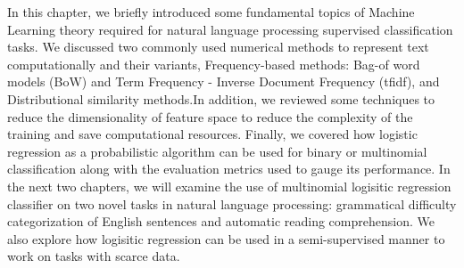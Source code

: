 In this chapter, we briefly introduced some fundamental topics of Machine Learning theory required for natural language processing supervised classification tasks. We discussed two commonly used numerical methods to represent text computationally and their variants, Frequency-based methods: Bag-of word models (BoW) and Term Frequency - Inverse Document Frequency (tfidf), and Distributional similarity methods.In addition, we reviewed some techniques to reduce the dimensionality of feature space to reduce the complexity of the training and save computational resources. Finally, we covered how logistic regression as a probabilistic algorithm can be used for binary or multinomial classification along with the evaluation metrics used to gauge its performance. In the next two chapters, we will examine the use of multinomial logisitic regression classifier on two novel tasks in natural language processing: grammatical difficulty categorization of English sentences and automatic reading comprehension. We also explore how logisitic regression can be used in a semi-supervised manner to work on tasks with scarce data. 